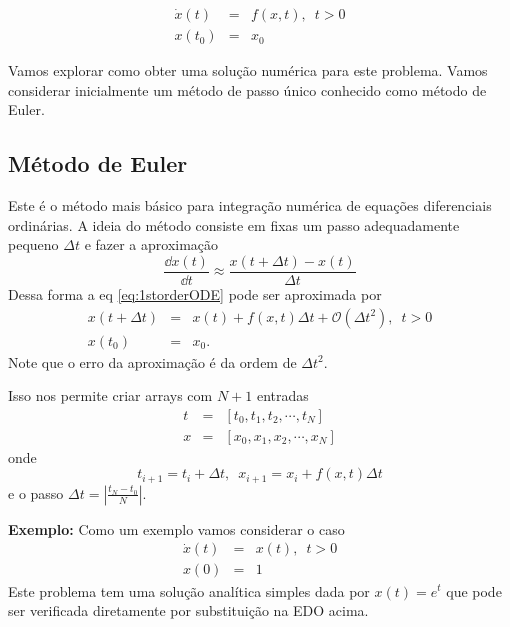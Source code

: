 \begin{equation}\label{eq:1storderODE}\begin{array}{rcl}
\dot x(t) & = & f(x , t),\,\,\, t>0\\
x(t_0) & = & x_0
\end{array}\end{equation}

Vamos explorar como obter uma solução numérica para este problema. Vamos considerar inicialmente um método de passo único conhecido como método de Euler.

\subsection{Método de Euler}

Este é o método mais básico para integração numérica de equações diferenciais ordinárias. A ideia do método consiste em fixas um passo adequadamente pequeno $\Delta t$ e fazer a aproximação 
\[ \frac{\dd x(t)}{\dd t} \approx \frac{x(t+\Delta t) - x(t)}{\Delta t}\]
Dessa forma a eq \ref{eq:1storderODE} pode ser aproximada por
\begin{equation}\label{eq:Euler-Method}\begin{array}{rcl}
x(t + \Delta t) & = & x(t) + f(x , t) \Delta t + \mathcal{O}(\Delta t^2),\,\,\, t>0\\
x(t_0) & = & x_0.
\end{array}\end{equation}
Note que o erro da aproximação é da ordem de $\Delta t^2$.

Isso nos permite criar arrays com $N+1$ entradas
\[\begin{array}{rcl}
    t &=& [t_0, t_1, t_2, \cdots, t_N ] \\
    x &=& [x_0, x_1, x_2, \cdots, x_N ]
\end{array} \]
onde 
\[ t_{i+1} = t_i + \Delta t, \,\,\, x_{i+1} = x_i + f(x,t)\Delta t \]
e o passo $\Delta t = \left|\frac{t_N - t_0}{N} \right|$.

{\bf Exemplo:} Como um exemplo vamos considerar o caso 
\[\begin{array}{rcl}
\dot x(t) & = & x(t),\,\,\, t>0\\
x(0) & = & 1
\end{array}\]
Este problema tem uma solução analítica simples dada por $x(t)=e^{t}$ que pode ser verificada diretamente por substituição na EDO acima. 

